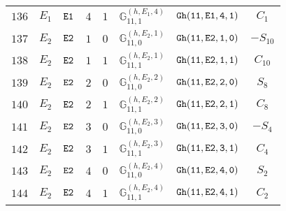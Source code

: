\documentclass[fleqn,8pt]{jsarticle}
\begin{document}
\begin{table}[ht!]
\begin{center}
\begin{tabular}{cccccccc}
$ 136 $ & $ E_{1} $ & $ {\tt E1} $ & $ 4 $ & $ 1 $ & $ \mathbb{G}_{11,1}^{(h,E_{1},4)} $ & $ {\tt Gh(11,E1,4,1)} $ & $ C_{1} $ \\
$ 137 $ & $ E_{2} $ & $ {\tt E2} $ & $ 1 $ & $ 0 $ & $ \mathbb{G}_{11,0}^{(h,E_{2},1)} $ & $ {\tt Gh(11,E2,1,0)} $ & $ - S_{10} $ \\
$ 138 $ & $ E_{2} $ & $ {\tt E2} $ & $ 1 $ & $ 1 $ & $ \mathbb{G}_{11,1}^{(h,E_{2},1)} $ & $ {\tt Gh(11,E2,1,1)} $ & $ C_{10} $ \\
$ 139 $ & $ E_{2} $ & $ {\tt E2} $ & $ 2 $ & $ 0 $ & $ \mathbb{G}_{11,0}^{(h,E_{2},2)} $ & $ {\tt Gh(11,E2,2,0)} $ & $ S_{8} $ \\
$ 140 $ & $ E_{2} $ & $ {\tt E2} $ & $ 2 $ & $ 1 $ & $ \mathbb{G}_{11,1}^{(h,E_{2},2)} $ & $ {\tt Gh(11,E2,2,1)} $ & $ C_{8} $ \\
$ 141 $ & $ E_{2} $ & $ {\tt E2} $ & $ 3 $ & $ 0 $ & $ \mathbb{G}_{11,0}^{(h,E_{2},3)} $ & $ {\tt Gh(11,E2,3,0)} $ & $ - S_{4} $ \\
$ 142 $ & $ E_{2} $ & $ {\tt E2} $ & $ 3 $ & $ 1 $ & $ \mathbb{G}_{11,1}^{(h,E_{2},3)} $ & $ {\tt Gh(11,E2,3,1)} $ & $ C_{4} $ \\
$ 143 $ & $ E_{2} $ & $ {\tt E2} $ & $ 4 $ & $ 0 $ & $ \mathbb{G}_{11,0}^{(h,E_{2},4)} $ & $ {\tt Gh(11,E2,4,0)} $ & $ S_{2} $ \\
$ 144 $ & $ E_{2} $ & $ {\tt E2} $ & $ 4 $ & $ 1 $ & $ \mathbb{G}_{11,1}^{(h,E_{2},4)} $ & $ {\tt Gh(11,E2,4,1)} $ & $ C_{2} $ \\
 \hline \hline
\end{tabular}
\end{center}
\end{table}
\end{document}
